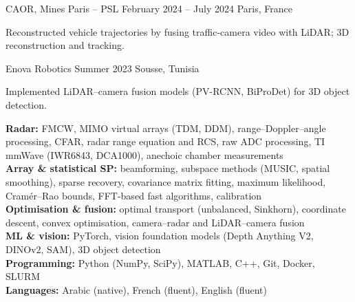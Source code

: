 %
        {CAOR, Mines Paris -- PSL}%
        {February 2024 -- July 2024}%
        {Paris, France}
\begin{cvitems}
  \item Reconstructed vehicle trajectories by fusing traffic-camera video with LiDAR; 3D
        reconstruction and tracking.
\end{cvitems}

%
        {Enova Robotics}%
        {Summer 2023}%
        {Sousse, Tunisia}
\begin{cvitems}
  \item Implemented LiDAR--camera fusion models (PV-RCNN, BiProDet) for 3D object detection.
\end{cvitems}


\noindent
\textbf{Radar:} FMCW, MIMO virtual arrays (TDM, DDM), range--Doppler--angle processing, CFAR,
  radar range equation and RCS, raw ADC processing, TI mmWave (IWR6843, DCA1000), anechoic
  chamber measurements\\
\textbf{Array \& statistical SP:} beamforming, subspace methods (MUSIC, spatial smoothing),
  sparse recovery, covariance matrix fitting, maximum likelihood, Cramér--Rao bounds,
  FFT-based fast algorithms, calibration\\
\textbf{Optimisation \& fusion:} optimal transport (unbalanced, Sinkhorn), coordinate descent,
  convex optimisation, camera--radar and LiDAR--camera fusion\\
\textbf{ML \& vision:} PyTorch, vision foundation models (Depth Anything V2, DINOv2, SAM),
  3D object detection\\
\textbf{Programming:} Python (NumPy, SciPy), MATLAB, C++, Git, Docker, SLURM\\
\textbf{Languages:} Arabic (native), French (fluent), English (fluent)

\PublicationsBlock
\EducationBlock


